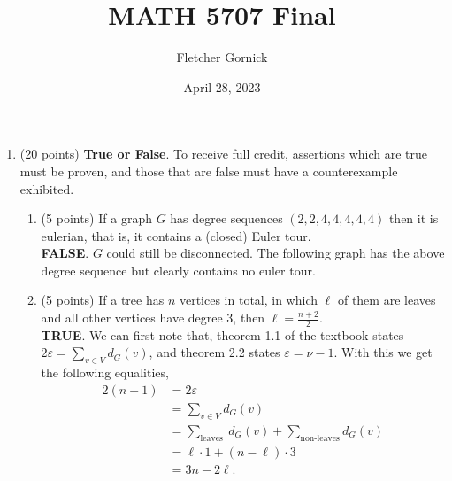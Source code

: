 \documentclass[11pt]{article}
\title{\vspace{-1.0cm}MATH 5707 Final}
\author{Fletcher Gornick}
\date{April 28, 2023}
\newcommand{\n}{\vspace{0.2cm}}
\begin{document}
\maketitle
  \begin{enumerate}
    \item (20 points) \textbf{True or False}.  To receive full credit, assertions which are true must be proven, and those that are false must have a counterexample exhibited.
      \begin{enumerate}
        \item (5 points) If a graph \(G\) has degree sequences \((2,2,4,4,4,4,4)\) then it is eulerian, that is, it contains a (closed) Euler tour. \n\\
          \textbf{FALSE}.  \(G\) could still be disconnected.  The following graph has the above degree sequence but clearly contains no euler tour.
          \begin{center}
            \resizebox{!}{4cm} {
            }
          \end{center}

        \item (5 points) If a tree has \(n\) vertices in total, in which \(\ell\) of them are leaves and all other vertices have degree 3, then \(\ell = \frac{n+2}2\). \n\\
          \textbf{TRUE}.  We can first note that, theorem 1.1 of the textbook states \(2\varepsilon = \sum_{v \in V} d_G(v)\), and theorem 2.2 states \(\varepsilon = \nu-1\).  With this we get the following equalities,
          \begin{align*}
            2(n-1) &= 2 \varepsilon \\
                   &= \sum_{v \in V} d_G(v) \\
                   &= \sum_{\text{leaves }} d_G(v) + \sum_{\text{non-leaves}} d_G(v) \\
                   &= \ell \cdot 1 + (n - \ell) \cdot 3 \\
                   &= 3n - 2\ell.
          \end{align*}


\end{enumerate}
\end{enumerate}
\end{document}
